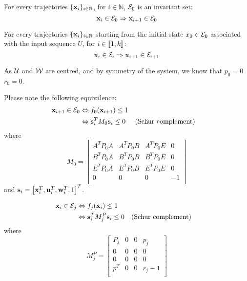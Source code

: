 For every trajectories $\{ \mathbf{x}_i\}_{i\in \mathbb{N}}$, for $i \in \mathbb{N}$, $\mathcal{E}_0$ is an invariant set:
\begin{equation}\label{inv_ellipse}
 \mathbf{x}_i \in \mathcal{E}_0 \Rightarrow  \mathbf{x}_{i+1} \in \mathcal{E}_0
\end{equation}

For every trajectories $\{ \mathbf{x}_i\}_{i \in \mathbb{N}}$ starting from the initial state $x_0 \in \mathcal{E}_0$ associated with the input sequence $U$, for $i \in \left \llbracket 1,k \right \rrbracket$:
\begin{equation} \label{next_ellipse}
 \mathbf{x}_i \in \mathcal{E}_i \Rightarrow  \mathbf{x}_{i+1} \in \mathcal{E}_{i+1}
\end{equation}

As $\mathcal{U}$ and $\mathcal{W}$ are centred, and by symmetry of the system, we know that $p_0 = 0$$r_0 = 0$.

Please note the following equivalence:
\begin{align*}
 \mathbf{x}_{i+1} \in \mathcal{E}_0 
&\Leftrightarrow f_0( \mathbf{x}_{i+1}) \leq 1 \\
&\Leftrightarrow  \mathbf{s}_i^T M_0  \mathbf{s}_i \leq 0 && \text{(Schur complement)}
\end{align*}
where
\begin{equation}
M_0 =
\begin{bmatrix}
A^T P_0 A & A^T P_0 B & A^T P_0 E & 0 \\
B^T P_0 A & B^T P_0 B & B^T P_0 E & 0 \\
E^T P_0 A & E^T P_0 B & E^T P_0 E & 0 \\
0       & 0       & 0       & -1 \\
\end{bmatrix}
\end{equation}
and $ \mathbf{s}_i = \left[  \mathbf{x}_i^T,  \mathbf{u}_i^T,  \mathbf{w}_i^T, 1 \right]^T$.

\begin{align*}
 \mathbf{x}_{i} \in \mathcal{E}_j 
&\Leftrightarrow f_j( \mathbf{x}_{i}) \leq 1 \\
&\Leftrightarrow  \mathbf{s}_i^T M^P_{j}  \mathbf{s}_i \leq 0 && \text{(Schur complement)}
\end{align*}
where
\begin{equation}
M^P_{j} =
\begin{bmatrix}
  P_j 	& 0 & 0 & p_j\\
  0 	& 0 & 0 & 0\\
  0 	& 0 & 0 & 0\\
  p^T 	& 0 & 0 & r_j-1\\
\end{bmatrix}
\end{equation}

